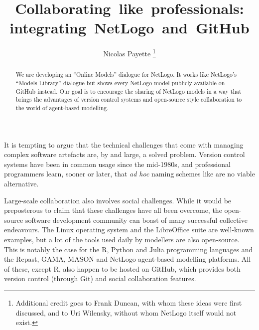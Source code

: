 \documentclass[runningheads]{llncs}
\begin{document}
%
\title{Collaborating~like~professionals: integrating~NetLogo~and~GitHub}

\author{Nicolas Payette%
  \thanks{Additional credit goes to Frank Duncan, with whom these ideas were first discussed, and to Uri Wilensky, without whom NetLogo itself would not exist.}
}

%
\maketitle              %
%
\begin{abstract}
  We are developing an “Online Models” dialogue for NetLogo. It works like NetLogo's “Models Library” dialogue but shows every NetLogo model publicly available on GitHub instead. Our goal is to encourage the sharing of NetLogo models in a way that brings the advantages of version control systems and open-source style collaboration to the world of agent-based modelling.
\end{abstract}

It is tempting to argue that the technical challenges that come with managing complex software artefacts are, by and large, a solved problem. Version control systems have been in common usage since the mid-1980s, and professional programmers learn, sooner or later, that \emph{ad hoc} naming schemes like  are no viable alternative.

Large-scale collaboration also involves social challenges. While it would be preposterous to claim that these challenges have all been overcome, the open-source software development community can boast of many successful collective endeavours. The Linux operating system and the LibreOffice suite are well-known examples, but a lot of the tools used daily by modellers are also open-source. This is notably the case for the R, Python and Julia programming languages and the Repast\cite{collier_repast:_2003}, GAMA\cite{taillandier_gama:_2010,grignard_gama_2013}, MASON \cite{luke_mason:_2003,luke_mason:_2004,luke_mason:_2005} and NetLogo \cite{wilensky_netlogo_1999,tisue_netlogo:_2004} agent-based modelling platforms. All of these, except R, also happen to be hosted on GitHub\cite{noauthor_github_nodate}, which provides both version control (through Git) and social collaboration features.
\end{document}
